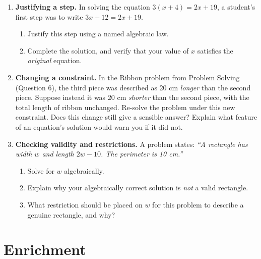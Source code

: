 \documentclass[11pt]{article}
\newcommand{\qspace}{\vspace{1.0cm}}
\begin{document}
\begin{enumerate}
  \item \textbf{Justifying a step.} In solving the equation $3(x + 4) = 2x + 19$, a student's first step was to write $3x + 12 = 2x + 19$.
  \begin{enumerate}
    \item Justify this step using a named algebraic law.
    \item Complete the solution, and verify that your value of $x$ satisfies the \emph{original} equation.
  \end{enumerate}
  \qspace

  \item \textbf{Changing a constraint.} In the Ribbon problem from Problem Solving (Question 6), the third piece was described as 20 cm \emph{longer} than the second piece. Suppose instead it was 20 cm \emph{shorter} than the second piece, with the total length of ribbon unchanged. Re-solve the problem under this new constraint. Does this change still give a sensible answer? Explain what feature of an equation's solution would warn you if it did not.
  \qspace

  \item \textbf{Checking validity and restrictions.} A problem states: \textit{``A rectangle has width $w$ and length $2w - 10$. The perimeter is 10 cm.''}
  \begin{enumerate}
    \item Solve for $w$ algebraically.
    \item Explain why your algebraically correct solution is \emph{not} a valid rectangle.
    \item What restriction should be placed on $w$ for this problem to describe a genuine rectangle, and why?
  \end{enumerate}
  \qspace
\end{enumerate}

\newpage
\section{Enrichment}
\end{document}
